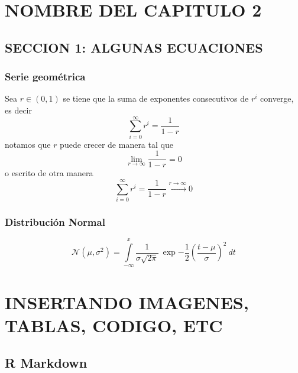 \documentclass[letterpaper,10pt, openright]{report}
\begin{document}
\hypertarget{nombre-del-capitulo-2}{%
\chapter{NOMBRE DEL CAPITULO 2}\label{nombre-del-capitulo-2}}

\hypertarget{seccion-1-algunas-ecuaciones}{%
\section{SECCION 1: ALGUNAS
ECUACIONES}\label{seccion-1-algunas-ecuaciones}}

\hypertarget{serie-geometrica}{%
\subsection{Serie geométrica}\label{serie-geometrica}}

Sea \(r\in (0,1)\) se tiene que la suma de exponentes consecutivos de
\(r^i\) converge, es decir \begin{equation}
\sum_{i=0}^{\infty} r^i = \frac{1}{1-r}
\end{equation} notamos que \(r\) puede crecer de manera tal que \[
\lim_{r\to \infty} \frac{1}{1-r} = 0
\] o escrito de otra manera \[
\sum_{i=0}^{\infty} r^i = \frac{1}{1-r} \stackrel{r\to \infty}{\longrightarrow} 0
\]

\hypertarget{distribucion-normal}{%
\subsection{Distribución Normal}\label{distribucion-normal}}

\begin{equation}
\mathcal{N}(\mu,\sigma^2) = \int\limits_{-\infty}^{x} \frac1{\sigma\sqrt{2\pi}}\: \exp{-\frac{1}{2}\left(\frac{t-\mu}{\sigma}\right)^2}\: dt
\end{equation}

\appendix

\hypertarget{insertando-imagenes-tablas-codigo-etc}{%
\chapter{INSERTANDO IMAGENES, TABLAS, CODIGO,
ETC}\label{insertando-imagenes-tablas-codigo-etc}}

\hypertarget{r-markdown}{%
\section{R Markdown}\label{r-markdown}}
\end{document}
